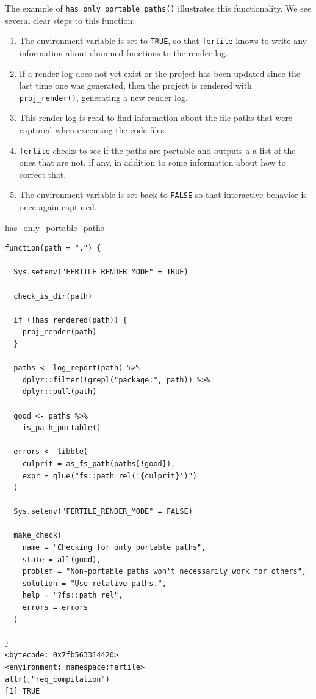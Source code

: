\documentclass[12pt,twoside]{reedthesis}
\newenvironment{Shaded}{\begin{snugshade}}{\end{snugshade}}
\newcommand{\NormalTok}[1]{#1}
\begin{document}
The example of \texttt{has\_only\_portable\_paths()} illustrates this
functionality. We see several clear steps to this function:
\begin{enumerate}
\def\labelenumi{\arabic{enumi}.}
\item
  The environment variable is set to \texttt{TRUE}, so that
  \texttt{fertile} knows to write any information about shimmed
  functions to the render log.
\item
  If a render log does not yet exist or the project has been updated
  since the last time one was generated, then the project is rendered
  with \texttt{proj\_render()}, generating a new render log.
\item
  This render log is read to find information about the file paths that
  were captured when executing the code files.
\item
  \texttt{fertile} checks to see if the paths are portable and outputs a
  a list of the ones that are not, if any, in addition to some
  information about how to correct that.
\item
  The environment variable is set back to \texttt{FALSE} so that
  interactive behavior is once again captured.
\end{enumerate}
\begin{Shaded}
\begin{Highlighting}[]
\NormalTok{has_only_portable_paths}
\end{Highlighting}
\end{Shaded}
\begin{verbatim}
function(path = ".") {

  Sys.setenv("FERTILE_RENDER_MODE" = TRUE)

  check_is_dir(path)

  if (!has_rendered(path)) {
    proj_render(path)
  }

  paths <- log_report(path) %>%
    dplyr::filter(!grepl("package:", path)) %>%
    dplyr::pull(path)

  good <- paths %>%
    is_path_portable()

  errors <- tibble(
    culprit = as_fs_path(paths[!good]),
    expr = glue("fs::path_rel('{culprit}')")
  )

  Sys.setenv("FERTILE_RENDER_MODE" = FALSE)

  make_check(
    name = "Checking for only portable paths",
    state = all(good),
    problem = "Non-portable paths won't necessarily work for others",
    solution = "Use relative paths.",
    help = "?fs::path_rel",
    errors = errors
  )

}
<bytecode: 0x7fb563314420>
<environment: namespace:fertile>
attr(,"req_compilation")
[1] TRUE
\end{verbatim}
\end{document}
